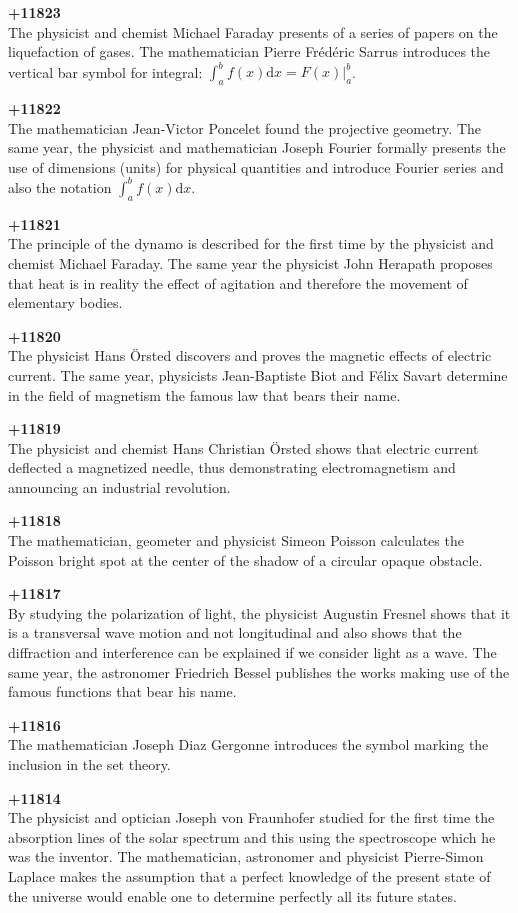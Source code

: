 \textbf{+11823}\\
The physicist and chemist Michael Faraday presents of a series of papers on the liquefaction of gases.  The mathematician Pierre Frédéric Sarrus introduces the vertical bar symbol for integral: $\int_a^bf(x)\mathrm{d}x=F(x)|_a^b$.

\textbf{+11822}\\
The mathematician Jean-Victor Poncelet found the projective geometry. The same year, the physicist and mathematician Joseph Fourier formally presents the use of dimensions (units) for physical quantities and introduce Fourier series and also the notation $\int_a^bf(x)\mathrm{d}x$.

\textbf{+11821}\\
The principle of the dynamo is described for the first time by the physicist and chemist Michael Faraday. The same year the physicist John Herapath proposes that heat is in reality the effect of agitation and therefore the movement of elementary bodies.

\textbf{+11820}\\
The physicist Hans Örsted discovers and proves the magnetic effects of electric current. The same year, physicists Jean-Baptiste Biot and Félix Savart determine in the field of magnetism the famous law that bears their name.

\textbf{+11819}\\
The physicist and chemist Hans Christian Örsted shows that electric current deflected a magnetized needle, thus demonstrating electromagnetism and announcing an industrial revolution.

\textbf{+11818}\\
The mathematician, geometer and physicist Simeon Poisson calculates the Poisson bright spot at the center of the shadow of a circular opaque obstacle.

\textbf{+11817}\\
By studying the polarization of light, the physicist Augustin Fresnel shows that it is a transversal wave motion and not longitudinal and also shows that the diffraction and interference can be explained if we consider light as a wave. The same year, the astronomer Friedrich Bessel publishes the works making use of the famous functions that bear his name.

\textbf{+11816}\\
The mathematician Joseph Diaz Gergonne introduces the symbol marking the inclusion in the set theory.

\textbf{+11814}\\
The physicist and optician Joseph von Fraunhofer studied for the first time the absorption lines of the solar spectrum and this using the spectroscope which he was the inventor. The mathematician, astronomer and physicist Pierre-Simon Laplace makes the assumption that a perfect knowledge of the present state of the universe would enable one to determine perfectly all its future states.

